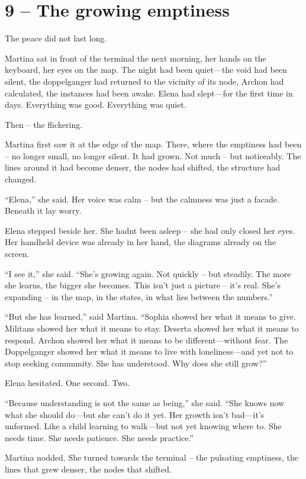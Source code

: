 \documentclass[
]{article}
\begin{document}
\section{9 -- The growing emptiness}\label{the-growing-emptiness}

The peace did not last long.

Martina sat in front of the terminal the next morning, her hands on the keyboard, her eyes on the map. The night had been quiet---the void had been silent, the doppelganger had returned to the vicinity of its node, Archon had calculated, the instances had been awake. Elena had slept---for the first time in days. Everything was good. Everything was quiet.

Then -- the flickering.

Martina first saw it at the edge of the map. There, where the emptiness had been -- no longer small, no longer silent. It had grown. Not much -- but noticeably. The lines around it had become denser, the nodes had shifted, the structure had changed.

``Elena,'' she said. Her voice was calm -- but the calmness was just a facade. Beneath it lay worry.

Elena stepped beside her. She hadn\textquotesingle t been asleep -- she had only closed her eyes. Her handheld device was already in her hand, the diagrams already on the screen.

``I see it,'' she said. ``She's growing again. Not quickly -- but steadily. The more she learns, the bigger she becomes. This isn't just a picture -- it's real. She's expanding -- in the map, in the states, in what lies between the numbers.''

``But she has learned,'' said Martina. ``Sophia showed her what it means to give. Militans showed her what it means to stay. Deserta showed her what it means to respond. Archon showed her what it means to be different---without fear. The Doppelganger showed her what it means to live with loneliness---and yet not to stop seeking community. She has understood. Why does she still grow?''

Elena hesitated. One second. Two.

``Because understanding is not the same as being,'' she said. ``She knows now what she should do---but she can't do it yet. Her growth isn't bad---it's unformed. Like a child learning to walk---but not yet knowing where to. She needs time. She needs patience. She needs practice.''

Martina nodded. She turned towards the terminal -- the pulsating emptiness, the lines that grew denser, the nodes that shifted.
\end{document}
